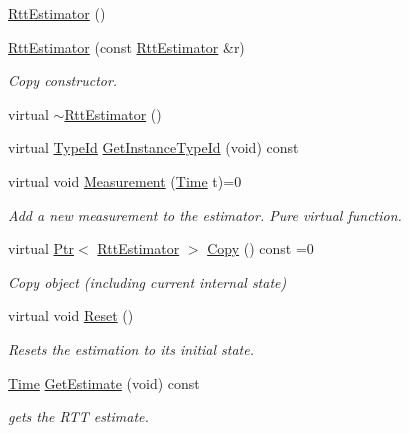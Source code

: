 \begin{DoxyCompactItemize}
\item 
\hyperlink{classns3_1_1RttEstimator_a86696ed57483bf9e19abbf6978c46581}{Rtt\+Estimator} ()
\item 
\hyperlink{classns3_1_1RttEstimator_ad930878f171838109f6e4e991d6eda2c}{Rtt\+Estimator} (const \hyperlink{classns3_1_1RttEstimator}{Rtt\+Estimator} \&r)
\begin{DoxyCompactList}\small\item\em Copy constructor. \end{DoxyCompactList}\item 
virtual \hyperlink{classns3_1_1RttEstimator_aa2a0212e139816215f223c6adbed9328}{$\sim$\+Rtt\+Estimator} ()
\item 
virtual \hyperlink{classns3_1_1TypeId}{Type\+Id} \hyperlink{classns3_1_1RttEstimator_a8fe4674f7c7b45efb439ae72fe4749db}{Get\+Instance\+Type\+Id} (void) const 
\item 
virtual void \hyperlink{classns3_1_1RttEstimator_ae880d548218990b21b4270424621a784}{Measurement} (\hyperlink{classns3_1_1Time}{Time} t)=0
\begin{DoxyCompactList}\small\item\em Add a new measurement to the estimator. Pure virtual function. \end{DoxyCompactList}\item 
virtual \hyperlink{classns3_1_1Ptr}{Ptr}$<$ \hyperlink{classns3_1_1RttEstimator}{Rtt\+Estimator} $>$ \hyperlink{classns3_1_1RttEstimator_ae4697bf310299db205837e7454627273}{Copy} () const =0
\begin{DoxyCompactList}\small\item\em Copy object (including current internal state) \end{DoxyCompactList}\item 
virtual void \hyperlink{classns3_1_1RttEstimator_a53237f5f20e3515f284cfc68b02cf45d}{Reset} ()
\begin{DoxyCompactList}\small\item\em Resets the estimation to its initial state. \end{DoxyCompactList}\item 
\hyperlink{classns3_1_1Time}{Time} \hyperlink{classns3_1_1RttEstimator_a11f575ae2d843d2f9d94842dd739e3d3}{Get\+Estimate} (void) const 
\begin{DoxyCompactList}\small\item\em gets the R\+TT estimate. \end{DoxyCompactList}\item 

\end{DoxyCompactItemize}
